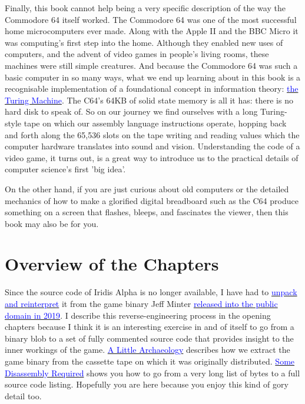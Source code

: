 Finally, this book cannot help being a very specific description of the way
the Commodore 64 itself worked. The Commodore 64 was one of the most successful
home microcomputers ever made. Along with the Apple II and the BBC Micro it was
computing's first step into the home. Although they enabled new uses of computers,
and the advent of video games in people's living rooms, these machines were still
simple creatures. And because the Commodore 64 was such a basic computer
in so many ways, what we end up learning about in this book is a recognisable implementation
of a foundational concept in information theory:
\href{https://en.wikipedia.org/wiki/Turing_machine}{\textcolor{blue}{the Turing Machine}}.
The C64's 64KB of solid state memory is all it has: there is no hard 
disk to speak of. So on our journey we find ourselves with a long Turing-style tape on which
our assembly language instructions operate, hopping back and forth along the 
65,536 slots on the tape writing and reading values which the computer hardware
translates into sound and vision. Understanding the code of a video game, it
turns out, is a great way to introduce us to the practical details of
computer science's first 'big idea'.

On the other hand, if you are just curious about old computers or the detailed mechanics of how to make a
glorified digital breadboard such as the C64 produce something on a screen that
flashes, bleeps, and fascinates the viewer, then this book may also be for you. 

\section*{Overview of the Chapters}
Since the source code of Iridis Alpha is no longer available, I have had to
\href{https://github.com/mwenge/iridisalpha}{\textcolor{blue}{unpack and
reinterpret}} it from the game binary Jeff Minter
\href{https://www.llamasoftarchive.org/oldsite/llamasoft/cbm64/IridisAlpha.zip}{\textcolor{blue}{released
into the public domain in 2019}}. I describe this reverse-engineering process
in the opening chapters because I think it is an interesting exercise in and of
itself to go from a binary blob to a set of fully commented source code that
provides insight to the inner workings of the game.
\hyperref[sec:archaeo]{\textcolor{blue}{A Little Archaeology}} describes how we
extract the game binary from the cassette tape on which it was originally
distributed. \hyperref[sec:disassembly]{\textcolor{blue}{Some Disassembly
Required}} shows you how to go from a very long list of bytes to a full source
code listing. Hopefully you are here because you enjoy this kind of gory detail
too.

